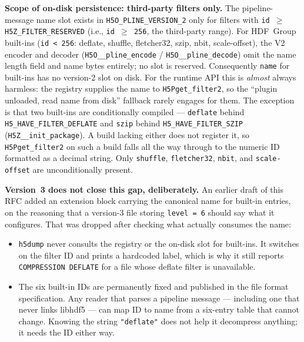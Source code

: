 \documentclass[../RFC-HDFG-2026-001.tex]{subfiles}
\begin{document}
\begin{itemize}
  \textbf{Scope of on-disk persistence: third-party filters only.}
  The pipeline-message name slot exists in \texttt{H5O\_PLINE\_VERSION\_2}
  only for filters with \texttt{id $\geq$ H5Z\_FILTER\_RESERVED} (i.e.,
  \texttt{id $\geq$ 256}, the third-party range).  For HDF~Group
  built-ins (\texttt{id < 256}: deflate, shuffle, fletcher32, szip,
  nbit, scale-offset), the V2 encoder and decoder
  (\texttt{H5O\_\_pline\_encode} / \texttt{H5O\_\_pline\_decode}) omit
  the name length field and name bytes entirely; no slot is reserved.
  Consequently \texttt{name} for built-ins has no version-2 slot on
  disk.  For the runtime API this is \emph{almost} always harmless: the
  registry supplies the name to \texttt{H5Pget\_filter2}, so the ``plugin
  unloaded, read name from disk'' fallback rarely engages for them.  The
  exception is that two built-ins are conditionally compiled ---
  \texttt{deflate} behind \texttt{H5\_HAVE\_FILTER\_DEFLATE} and
  \texttt{szip} behind \texttt{H5\_HAVE\_FILTER\_SZIP}
  (\texttt{H5Z\_\_init\_package}).  A build lacking either does not
  register it, so \texttt{H5Pget\_filter2} on such a build falls all the
  way through to the numeric ID formatted as a decimal string.  Only
  \texttt{shuffle}, \texttt{fletcher32}, \texttt{nbit}, and
  \texttt{scale-offset} are unconditionally present.

  \textbf{Version~3 does not close this gap, deliberately.}  An earlier
  draft of this RFC added an extension block carrying the canonical name
  for built-in entries, on the reasoning that a version-3 file storing
  \texttt{level~=~6} should say what it configures.  That was dropped
  after checking what actually consumes the name:

  \begin{itemize}
  \item \texttt{h5dump} never consults the registry or the on-disk slot
    for built-ins.  It switches on the filter ID and prints a hardcoded
    label, which is why it still reports \texttt{COMPRESSION DEFLATE} for
    a file whose deflate filter is unavailable.
  \item The six built-in IDs are permanently fixed and published in the
    file format specification.  Any reader that parses a pipeline message
    --- including one that never links libhdf5 --- can map ID to name
    from a six-entry table that cannot change.  Knowing the string
    \texttt{"deflate"} does not help it decompress anything; it needs the
    ID either way.
  \end{itemize}


\end{itemize}
\end{document}
